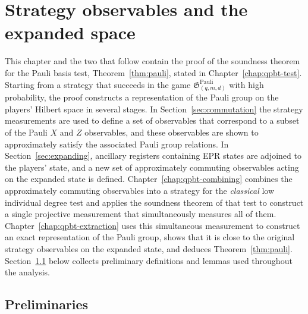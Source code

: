 \chapter{Strategy observables and the expanded space}
\label{chap:qpbt-observables}

This chapter and the two that follow contain the proof of the soundness
theorem for the Pauli basis test, Theorem~\ref{thm:pauli}, stated in
Chapter~\ref{chap:qpbt-test}. Starting from a strategy that succeeds in the
game $\mathfrak{G}^{\mathrm{Pauli}}_{(q,m,d)}$ with high probability, the proof
constructs a representation of the Pauli group on the players' Hilbert space
in several stages. In Section~\ref{sec:commutation} the strategy measurements
are used to define a set of observables that correspond to a subset of the
Pauli $X$ and $Z$ observables, and these observables are shown to
approximately satisfy the associated Pauli group relations. In
Section~\ref{sec:expanding}, ancillary registers containing EPR states are
adjoined to the players' state, and a new set of approximately commuting
observables acting on the expanded state is defined.
Chapter~\ref{chap:qpbt-combining} combines the approximately commuting
observables into a strategy for the \emph{classical} low individual degree
test and applies the soundness theorem of that test to construct a single
projective measurement that simultaneously measures all of them.
Chapter~\ref{chap:qpbt-extraction} uses this simultaneous measurement to
construct an exact representation of the Pauli group, shows that it is close
to the original strategy observables on the expanded state, and deduces
Theorem~\ref{thm:pauli}. Section~\ref{sec:qld-prelim} below collects
preliminary definitions and lemmas used throughout the analysis.

\section{Preliminaries}
\label{sec:qld-prelim}


